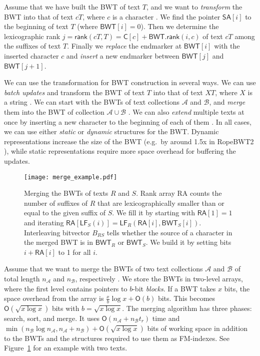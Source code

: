 \documentclass[smallabstract,smallcaptions]{dccpaper}
\newcommand{\Oh}{\ensuremath{\mathsf{O}}}
\newcommand{\BWT}{\textsf{BWT}}
\newcommand{\RA}{\textsf{RA}}
\newcommand{\mSA}{\ensuremath{\mathsf{SA}}}
\newcommand{\mBWT}{\ensuremath{\mathsf{BWT}}}
\newcommand{\mC}{\ensuremath{\mathsf{C}}}
\newcommand{\mRA}{\ensuremath{\mathsf{RA}}}
\newcommand{\mLF}{\ensuremath{\mathsf{LF}}}
\newcommand{\mrank}{\ensuremath{\mathsf{rank}}}
\newcommand{\Acoll}{\ensuremath{\mathcal{A}}}
\newcommand{\Bcoll}{\ensuremath{\mathcal{B}}}
\newcommand{\ropebwtii}{\textsf{RopeBWT2}}
\begin{document}
Assume that we have built the \BWT{} of text $T$, and we want to \emph{transform} the \BWT{} into that of text $cT$, where $c$ is a character \cite{Hon2007}. We find the pointer $\mSA[i]$ to the beginning of text $T$ (where $\mBWT[i] = 0$). Then we determine the lexicographic rank $j = \mrank(cT, T) = \mC[c] + \mBWT.\mrank(i, c)$ of text $cT$ among the suffixes of text $T$. Finally we \emph{replace} the endmarker at $\mBWT[i]$ with the inserted character $c$ and \emph{insert} a new endmarker between $\mBWT[j]$ and $\mBWT[j+1]$.

We can use the transformation for \BWT{} construction in several ways. We can use \emph{batch updates} and transform the \BWT{} of text $T$ into that of text $XT$, where $X$ is a string \cite{Hon2007}. We can start with the \BWT{}s of text collections $\Acoll$ and $\Bcoll$, and \emph{merge} them into the \BWT{} of collection $\Acoll \cup \Bcoll$ \cite{Siren2009}. We can also \emph{extend} multiple texts at once by inserting a new character to the beginning of each of them \cite{Bauer2013}. In all cases, we can use either \emph{static} or \emph{dynamic} \cite{Chan2007} structures for the \BWT. Dynamic representations increase the size of the \BWT{} (e.g.~by around 1.5x in \ropebwtii{} \cite{Li2014a}), while static representations require more space overhead for buffering the updates.

\begin{figure}[t!]
\texttt{[image: merge\_example.pdf]}
\caption{Merging the \BWT{}s of texts $R$ and $S$. Rank array \RA{} counts the number of suffixes of $R$ that are lexicographically smaller than or equal to the given suffix of $S$. We fill it by starting with $\mRA[1] = 1$ and iterating $\mRA[\mLF_{S}(i)] = \mLF_{R}(\mRA[i], \mBWT_{S}[i])$. Interleaving bitvector $B_{RS}$ tells whether the source of a character in the merged \BWT{} is in $\mBWT_{R}$ or $\mBWT_{S}$. We build it by setting bits $i+\mRA[i]$ to 1 for all $i$.}\label{fig:merge}%
\vspace{-6pt}
\end{figure}

Assume that we want to merge the \BWT{}s of two text collections $\Acoll$ and $\Bcoll$ of total length $n_{\Acoll}$ and $n_{\Bcoll}$, respectively \cite{Siren2009}. We store the \BWT{}s in two-level arrays, where the first level contains pointers to $b$\nobreakdash-bit \emph{blocks}. If a \BWT{} takes $x$ bits, the space overhead from the array is $\frac{x}{b} \log x + \Oh(b)$ bits. This becomes $\Oh(\sqrt{x \log x})$ bits with $b = \sqrt{x \log x}$. The merging algorithm has three phases: search, sort, and merge. It uses $\Oh(n_{\Acoll} + n_{\Bcoll} t_{r})$ time and $\min(n_{\Bcoll} \log n_{\Acoll}, n_{\Acoll} + n_{\Bcoll}) + \Oh(\sqrt{x \log x})$ bits of working space in addition to the \BWT{}s and the structures required to use them as FM-indexes. See Figure~\ref{fig:merge} for an example with two texts.
\end{document}
